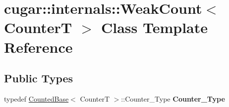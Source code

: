 \hypertarget{classcugar_1_1internals_1_1_weak_count}{}\section{cugar\+:\+:internals\+:\+:Weak\+Count$<$ CounterT $>$ Class Template Reference}
\label{classcugar_1_1internals_1_1_weak_count}
\subsection*{Public Types}
\begin{DoxyCompactItemize}
\item 
\mbox{\label{classcugar_1_1internals_1_1_weak_count_ac224cbfc38ec64a447dd772f15e54538}} 
typedef \hyperlink{classcugar_1_1internals_1_1_counted_base}{Counted\+Base}$<$ CounterT $>$\+::Counter\+\_\+\+Type {\bfseries Counter\+\_\+\+Type}
\end{DoxyCompactItemize}
